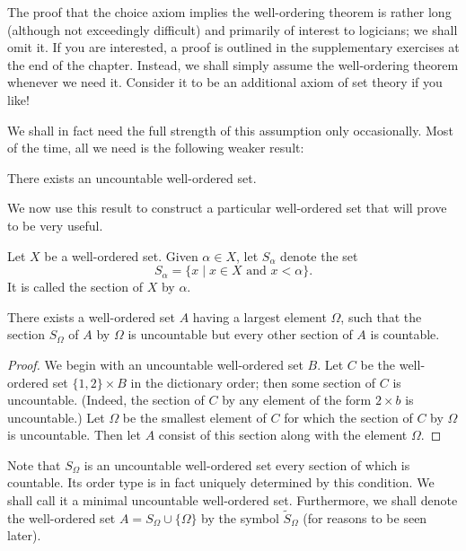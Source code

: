 The proof that the choice axiom implies the well-ordering theorem is rather long 
(although not exceedingly difficult) and primarily of interest to logicians; 
we shall omit it. If you are interested, a proof is outlined in the supplementary 
exercises at the end of the chapter. Instead, we shall simply assume 
the well-ordering theorem whenever we need it. Consider it to be an additional axiom 
of set theory if you like!

We shall in fact need the full strength of this assumption only occasionally. 
Most of the time, all we need is the following weaker result:

\begin{ucorollary}
 There exists an uncountable well-ordered set.
\end{ucorollary}

We now use this result to construct a particular well-ordered set that will 
prove to be very useful.

\begin{definition}
 Let \(X\) be a well-ordered set. Given \(\alpha \in X\), let \(S_{\alpha }\) denote the set
 \[
 S_{\alpha } = \{ x \mid x \in X\text{ and }x < \alpha \}.
 \]
 It is called the section of \(X\) by \(\alpha\).
\end{definition}

\begin{lemma}
\label{lem:\thetheorem}
 There exists a well-ordered set \(A\) having a largest element \(\Omega\), such that the section \(S_{\Omega }\) of \(A\) by \(\Omega\) is uncountable but every other section of \(A\) is countable.
\end{lemma}

\begin{proof}
 We begin with an uncountable well-ordered set \(B\). Let \(C\) be the well-ordered set \(\{1,2\} \times B\) in the dictionary order; then some section of \(C\) is uncountable. (Indeed, the section of \(C\) by any element of the form \(2 \times b\) is uncountable.) Let \(\Omega\) be the smallest element of \(C\) for which the section of \(C\) by \(\Omega\) is uncountable. Then let \(A\) consist of this section along with the element \(\Omega\).
\end{proof}

Note that \(S_{\Omega }\) is an uncountable well-ordered set every section of which 
is countable. Its order type is in fact uniquely determined by this condition. 
We shall call it a minimal uncountable well-ordered set. Furthermore, 
we shall denote the well-ordered set \(A = S_{\Omega } \cup \{ \Omega \}\) 
by the symbol \(\widetilde{S}_{\Omega }\) (for reasons to be seen later).

